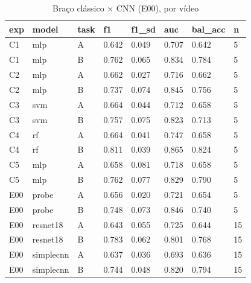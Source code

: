 \begin{table}[ht]
\centering
\caption{Braço clássico × CNN (E00), por vídeo}
\begin{tabular}{llllllll}
\toprule
exp & model & task & f1 & f1\_sd & auc & bal\_acc & n \\
\midrule
C1 & mlp & A & 0.642 & 0.049 & 0.707 & 0.642 & 5 \\
C1 & mlp & B & 0.762 & 0.065 & 0.834 & 0.784 & 5 \\
C2 & mlp & A & 0.662 & 0.027 & 0.716 & 0.662 & 5 \\
C2 & mlp & B & 0.737 & 0.074 & 0.845 & 0.756 & 5 \\
C3 & svm & A & 0.664 & 0.044 & 0.712 & 0.658 & 5 \\
C3 & svm & B & 0.757 & 0.075 & 0.823 & 0.713 & 5 \\
C4 & rf & A & 0.664 & 0.041 & 0.747 & 0.658 & 5 \\
C4 & rf & B & 0.811 & 0.039 & 0.865 & 0.824 & 5 \\
C5 & mlp & A & 0.658 & 0.081 & 0.718 & 0.658 & 5 \\
C5 & mlp & B & 0.762 & 0.077 & 0.829 & 0.790 & 5 \\
E00 & probe & A & 0.656 & 0.020 & 0.721 & 0.654 & 5 \\
E00 & probe & B & 0.748 & 0.073 & 0.846 & 0.740 & 5 \\
E00 & resnet18 & A & 0.643 & 0.055 & 0.725 & 0.644 & 15 \\
E00 & resnet18 & B & 0.783 & 0.062 & 0.801 & 0.768 & 15 \\
E00 & simplecnn & A & 0.637 & 0.036 & 0.693 & 0.636 & 15 \\
E00 & simplecnn & B & 0.744 & 0.048 & 0.820 & 0.794 & 15 \\
\bottomrule
\end{tabular}
\end{table}
